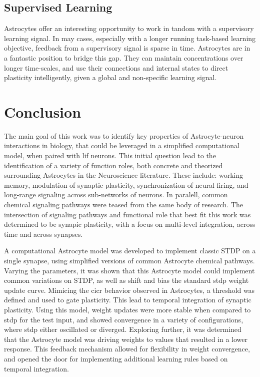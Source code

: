 \section{Supervised Learning}

Astrocytes offer an interesting opportunity to work in tandom with a supervisory
learning signal. In may cases, especially with a longer running task-based
learning objective, feedback from a supervisory signal is sparse in
time. Astrocytes are in a fantastic position to bridge this gap. They can
maintain \ca concentrations over longer time-scales, and use their connections
and internal states to direct plasticity intelligently, given a global and
non-specific learning signal.

\chapter{Conclusion} \label{chapter:conclusion}

The main goal of this work was to identify key properties of Astrocyte-neuron
interactions in biology, that could be leveraged in a simplified computational
model, when paired with \Gls{lif} neurons. This initial question lead to the
identification of a variety of function roles, both concrete and theorized
surrounding Astrocytes in the Neuroscience literature. These include: working
memory, modulation of synaptic plasticity, synchronization of neural firing, and
long-range signaling across sub-networks of neurons. In paralell, common
chemical signaling pathways were teased from the same body of
research. The intersection of signaling pathways and functional role that best
fit this work was determined to be synapic plasticity, with a focus on
multi-level integration, across time and across synapses.

A computational Astrocyte model was developed to implement classic STDP
on a single synapse, using simplified versions of common Astrocyte chemical
pathways. Varying the parameters, it was shown that this Astrocyte model could
implement common variations on STDP, as well as shift and bias the standard
\Gls{stdp} weight update curve. Mimicing the \Gls{cicr} behavior observed in
Astrocytes, a threshold was defined and used to gate plasticity. This lead to
temporal integration of synaptic plasticity. Using this model, weight updates
were more stable when compared to \Gls{stdp} for the test input, and showed
convergence in a variety of configurations, where \Gls{stdp} either oscillated
or diverged. Exploring further, it was determined that the Astrocyte model was
driving weights to values that resulted in a lower \ca response. This feedback
mechanism allowed for flexibility in weight convergence, and opened the door for
implementing additional learning rules based on temporal integration.

